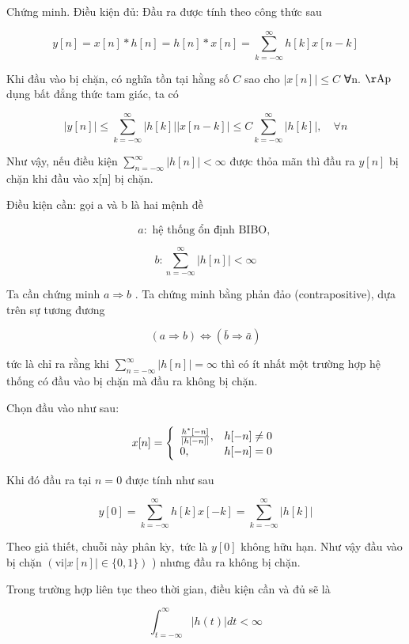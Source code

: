 \documentclass[
  10
]{article}
\begin{document}
Chứng minh. Điều kiện đủ: Đầu ra được tính theo công thức sau

\[
y [ n ] = x [ n ] * h [ n ] = h [ n ] * x [ n ] = \sum_ {k = - \infty} ^ {\infty} h [ k ] x [ n - k ]
\]

Khi đầu vào bị chặn, có nghĩa tồn tại hằng số \(C\) sao cho
\(| x [ n ] | \leq C\) ∀n. \(\mathrm { { \AA p } }\) dụng bất đẳng thức
tam giác, ta có

\[
| y [ n ] | \leq \sum_ {k = - \infty} ^ {\infty} | h [ k ] | | x [ n - k ] | \leq C \sum_ {k = - \infty} ^ {\infty} | h [ k ] |, \quad \forall n
\]

Như vậy, nếu điều kiện
\(\scriptstyle \sum _ { n = - \infty } ^ { \infty } | h [ n ] | < \infty\)
được thỏa mãn thì đầu ra \(y [ n ]\) bị chặn khi đầu vào x{[}n{]} bị
chặn.

Điều kiện cần: gọi a và b là hai mệnh đề

\[
a: \text {   hệ   thống   ổn   định   BIBO,   }
\]

\[
b: \sum_ {n = - \infty} ^ {\infty} | h [ n ] | <   \infty
\]

Ta cần chứng minh \(a \Rightarrow b\) . Ta chứng minh bằng phản đảo
(contrapositive), dựa trên sự tương đương

\[
(a \Rightarrow b) \Leftrightarrow (\bar {b} \Rightarrow \bar {a})
\]

tức là chỉ ra rằng khi
\(\scriptstyle \sum _ { n = - \infty } ^ { \infty } | h [ n ] | = \infty\)
thì có ít nhất một trường hợp hệ thống có đầu vào bị chặn mà đầu ra
không bị chặn.

Chọn đầu vào như sau:

\[
x [ n ] = \left\{ \begin{array}{l l} \frac {h ^ {*} [ - n ]}{| h [ - n ] |}, & h [ - n ] \neq 0 \\ 0, & h [ - n ] = 0 \end{array} \right.
\]

Khi đó đầu ra tại \(n = 0\) được tính như sau

\[
y [ 0 ] = \sum_ {k = - \infty} ^ {\infty} h [ k ] x [ - k ] = \sum_ {k = - \infty} ^ {\infty} | h [ k ] |
\]

Theo giả thiết, chuỗi này phân
\(\mathrm { k } \grave { \mathrm { y } } ,\) tức là \(y [ 0 ]\) không
hữu hạn. Như vậy đầu vào bị chặn
\(( \mathrm { v i } | x [ n ] | \in \{ 0 , 1 \} )\) ) nhưng đầu ra không
bị chặn. 

Trong trường hợp liên tục theo thời gian, điều kiện cần và đủ sẽ là

\[
\int_ {t = - \infty} ^ {\infty} | h (t) | d t <   \infty\tag{2.7}
\]
\end{document}
